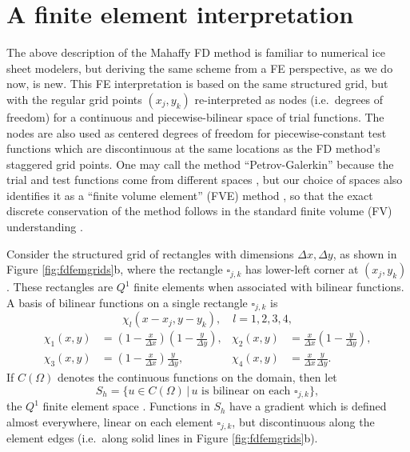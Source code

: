 \documentclass[11pt]{amsart}
\begin{document}
\section{A finite element interpretation}

The above description of the Mahaffy FD method is familiar to numerical ice sheet modelers, but deriving the same scheme from a FE perspective, as we do now, is new.  This FE interpretation is based on the same structured grid, but with the regular grid points $(x_j,y_k)$ re-interpreted as nodes (i.e.~degrees of freedom) for a continuous and piecewise-bilinear space of trial functions.  The nodes are also used as centered degrees of freedom for piecewise-constant test functions which are discontinuous at the same locations as the FD method's staggered grid points.  One may call the method ``Petrov-Galerkin'' because the trial and test functions come from different spaces \cite{Elmanetal2005}, but our choice of spaces also identifies it as a ``finite volume element'' (FVE) method \cite{EwingLinLin2002}, so that the exact discrete conservation of the method follows in the standard finite volume (FV) understanding \cite{LeVeque}.

Consider the structured grid of rectangles with dimensions $\Delta x,\Delta y$, as shown in Figure \ref{fig:fdfemgrids}b, where the rectangle $\square_{j,k}$ has lower-left corner at $(x_j,y_k)$.  These rectangles are $Q^1$ finite elements when associated with bilinear functions.  A basis of bilinear functions on a single rectangle $\square_{j,k}$ is
\begin{equation}
\chi_l(x-x_j,y-y_k), \quad l=1,2,3,4,
\end{equation}
\begin{align*}
\chi_1(x,y) &= \left(1-\tfrac{x}{\Delta x}\right) \left(1-\tfrac{y}{\Delta y}\right), & \chi_2(x,y) &= \tfrac{x}{\Delta x} \left(1-\tfrac{y}{\Delta y}\right), \\
\chi_3(x,y) &= \left(1-\tfrac{x}{\Delta x}\right) \tfrac{y}{\Delta y}, & \chi_4(x,y) &= \tfrac{x}{\Delta x} \tfrac{y}{\Delta y}. 
\end{align*}
If $C(\Omega)$ denotes the continuous functions on the domain, then let
\begin{equation}
S_h = \{u \in C(\Omega) \,\big|\, u \text{ is bilinear on each $\square_{j,k}$}\},
\end{equation}
the $Q^1$ finite element space \cite{Elmanetal2005}.  Functions in $S_h$ have a gradient which is defined almost everywhere, linear on each element $\square_{j,k}$, but discontinuous along the element edges (i.e.~along solid lines in Figure \ref{fig:fdfemgrids}b).
\end{document}
